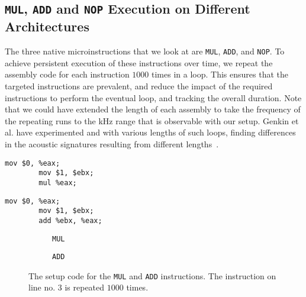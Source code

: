 \subsection{\texttt{MUL}, \texttt{ADD} and \texttt{NOP} Execution on Different Architectures}\label{chp4:subsec:MUL_ADD_NOP_instructions}
The three native microinstructions that we look at are \texttt{MUL}, \texttt{ADD}, and \texttt{NOP}.
To achieve persistent execution of these instructions over time, we repeat the assembly code for each instruction \(1000\) times in a loop.
This ensures that the targeted instructions are prevalent, and reduce the impact of the required instructions to perform the eventual loop, and tracking the overall duration.
Note that we could have extended the length of each assembly to take the frequency of the repeating runs to the kHz range that is observable with our setup.
Genkin et al. have experimented and with various lengths of such loops, finding differences in the acoustic signatures resulting from different lengths~\cite[Section 3.2]{DBLP:journals/iacr/GenkinST13}.

\newsavebox{\MULfigure}
	\begin{lrbox}{\MULfigure}%
	\begin{lstlisting}[language={[x86masm]Assembler}]
		mov $0, %eax;
		mov $1, $ebx;
		mul %eax;
	\end{lstlisting}
\end{lrbox}

\newsavebox{\ADDfigure}
	\begin{lrbox}{\ADDfigure}%
	\begin{lstlisting}[language={[x86masm]Assembler}]
		mov $0, %eax;
		mov $1, $ebx;
		add %ebx, %eax;
	\end{lstlisting}
\end{lrbox}

\begin{figure}[h]
    \begin{subfigure}{0.5\textwidth}
        \centering
        \usebox{\MULfigure}
        \caption{\texttt{MUL}}
    \end{subfigure}
    \begin{subfigure}{0.5\textwidth}
        \centering
        \usebox{\ADDfigure}
        \caption{\texttt{ADD}}
    \end{subfigure}
	\caption{The setup code for the \texttt{MUL} and \texttt{ADD} instructions. The instruction on line no. 3 is repeated \(1000\) times.}
	\label{lst:x86_add_mem}
\end{figure}

